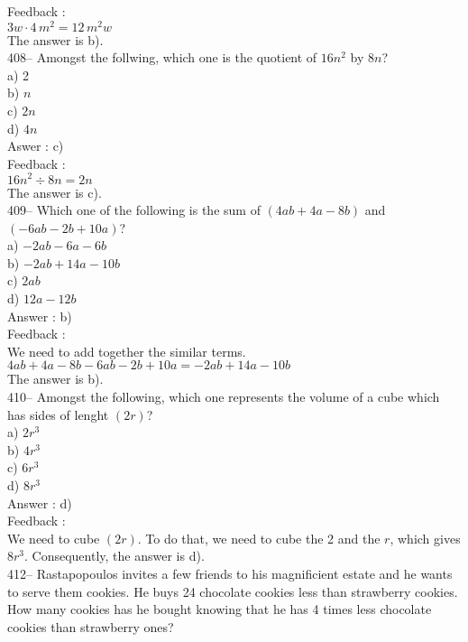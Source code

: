 ﻿\documentclass[letterpaper, 12pt]{article}
\begin{document}
Feedback : \\
$3w\cdot 4\,m^{2}=12\,m^{2}w$\\
The answer is b).\\

408-- Amongst the follwing, which one is the quotient of $16n^{2}$
by $8n$?\\
a) 2\\
b) $n$\\
c) $2n$\\
d) $4n$\\

Aswer : c)\\

Feedback : \\
$16n^{2}\div8n=2n$\\
The answer is c).\\

409-- Which one of the following is the sum of
$\left(4ab+4a-8b\right) $ and $\left(-6ab-2b+10a\right)$?\\
a) $-2ab-6a-6b$\\
b) $-2ab+14a-10b$\\
c) $2ab$\\
d) $12a-12b$\\

Answer : b)\\

Feedback : \\
We need to add together the similar terms.\\
$4ab+4a-8b-6ab-2b+10a=-2ab+14a-10b$\\
The answer is b).\\

410-- Amongst the following, which one represents the volume of a cube which has sides of lenght $\left( 2r\right)$?\\
a) $2r^{3}$\\
b) $4r^{3}$ \\
c) $6r^{3}$\\
d) $8r^{3}$\\

Answer : d)\\

Feedback : \\
We need to cube $\left( 2r\right)$. To do that, we need to cube the 2 and the $r$, which gives $8r^{3}$. Consequently, the answer is d).\\


412-- Rastapopoulos invites a few friends to his magnificient estate and he wants to serve them cookies. He buys 24 chocolate cookies less than strawberry cookies. How many cookies has he bought knowing that he has 4 times less chocolate cookies than strawberry ones?\\
\end{document}
